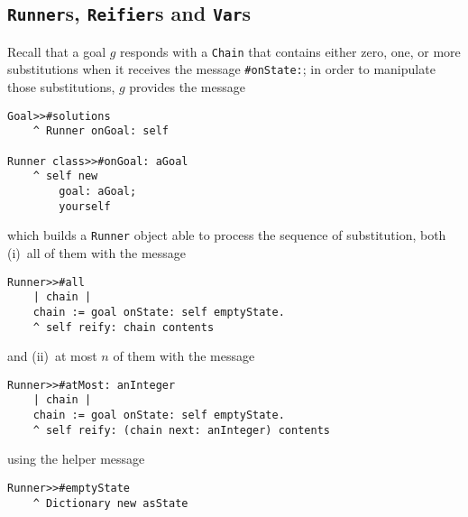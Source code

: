 \documentclass[a4paper,12pt]{article}
\begin{document}
\subsection{\texttt{Runner}s, \texttt{Reifier}s and \texttt{Var}s}

Recall that a goal $g$ responds with a \Verb|Chain| that contains either zero,
one, or more substitutions when it receives the message \Verb|#onState:|; in order
to manipulate those substitutions, $g$ provides the message
\begin{verbatim}
Goal>>#solutions
    ^ Runner onGoal: self

Runner class>>#onGoal: aGoal 
    ^ self new 
        goal: aGoal;
        yourself
\end{verbatim}
which builds a \Verb|Runner| object able to process the sequence of substitution, both (i)~all of them with the message
\begin{verbatim}
Runner>>#all
    | chain |
    chain := goal onState: self emptyState.
    ^ self reify: chain contents
\end{verbatim}
and (ii)~at most $n$ of them with the message
\begin{verbatim}
Runner>>#atMost: anInteger 
    | chain |
    chain := goal onState: self emptyState.
    ^ self reify: (chain next: anInteger) contents
\end{verbatim}
using the helper message 
\begin{verbatim}
Runner>>#emptyState
    ^ Dictionary new asState
\end{verbatim}
\end{document}
